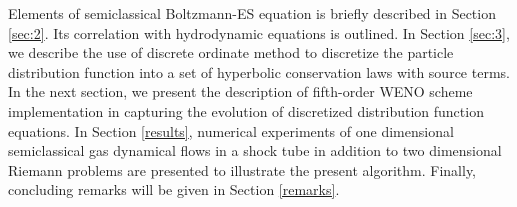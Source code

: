 \documentclass{rsproca}%
\begin{document}










Elements of semiclassical Boltzmann-ES equation is briefly described in Section \ref{sec:2}. Its correlation with hydrodynamic equations is outlined. In Section \ref{sec:3}, we describe the use of discrete ordinate method to discretize the particle distribution function into a set of hyperbolic conservation laws with source terms. In the next section, we present the description of fifth-order WENO scheme implementation in capturing the evolution of discretized distribution function equations. In Section \ref{results}, numerical experiments of one dimensional semiclassical gas dynamical flows in a shock tube in addition to two dimensional Riemann problems are presented to illustrate the present algorithm. Finally, concluding remarks will be given in Section \ref{remarks}.
\end{document}
